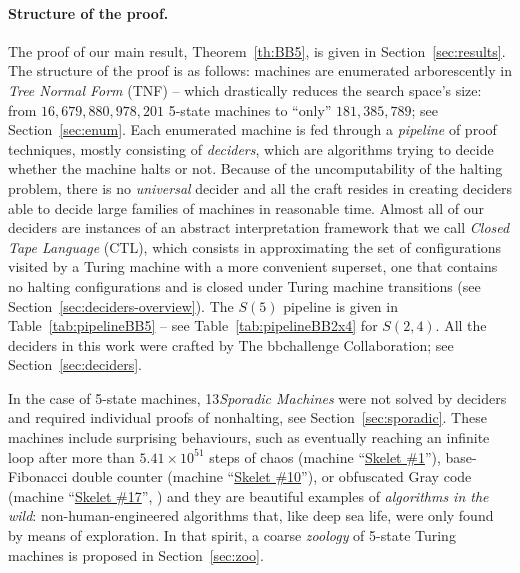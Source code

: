 \documentclass[a4paper,british]{article}
\theoremstyle{definition} %
\numberwithin{equation}{section}
\theoremstyle{definition} %
\newcommand{\BBtheFifthTNF}{181{,}385{,}789}
\newcommand{\numSporadic}{13\xspace}
\begin{document}
\paragraph{Structure of the proof.} The proof of our main result, Theorem~\ref{th:BB5}, is given in Section~\ref{sec:results}. The structure of the proof is as follows: machines are enumerated arborescently in \textit{Tree Normal Form} (TNF) \cite{Brady64} -- which drastically reduces the search space's size: from $16{,}679{,}880{,}978{,}201$ 5-state machines to ``only'' $\BBtheFifthTNF$; see Section~\ref{sec:enum}. Each enumerated machine is fed through a \textit{pipeline} of proof techniques, mostly consisting of \textit{deciders}, which are algorithms trying to decide whether the machine halts or not. Because of the uncomputability of the halting problem, there is no \textit{universal} decider and all the craft resides in creating deciders able to decide large families of machines in reasonable time. Almost all of our deciders are instances of an abstract interpretation framework that we call \textit{Closed Tape Language} (CTL), which consists in approximating the set of configurations visited by a Turing machine with a more convenient superset, one that contains no halting configurations and is closed under Turing machine transitions (see Section~\ref{sec:deciders-overview}). The $S(5)$ pipeline is given in Table~\ref{tab:pipelineBB5} -- see Table~\ref{tab:pipelineBB2x4} for $S(2,4)$. All the deciders in this work were crafted by The bbchallenge Collaboration; see Section~\ref{sec:deciders}.

In the case of 5-state machines, \numSporadic \textit{Sporadic Machines} were not solved by deciders and required individual proofs of nonhalting, see Section~\ref{sec:sporadic}. These machines include surprising behaviours, such as eventually reaching an infinite loop after more than $5.41\times10^{51}$ steps of chaos (machine ``\href{https://bbchallenge.org/1RB1RD_1LC0RC_1RA1LD_0RE0LB_---1RC}{Skelet \#1}''), base-Fibonacci double counter (machine ``\href{https://bbchallenge.org/1RB0RA_0LC1RA_1RE1LD_1LC0LD_---0RB}{Skelet \#10}''), or obfuscated Gray code (machine ``\href{https://bbchallenge.org/1RB---_0LC1RE_0LD1LC_1RA1LB_0RB0RA}{Skelet \#17}'', \cite{xu2024skelet17fifthbusy}) and they are beautiful examples of \textit{algorithms in the wild}: non-human-engineered algorithms that, like deep sea life, were only found by means of exploration. In that spirit, a coarse \textit{zoology} of 5-state Turing machines is proposed in Section~\ref{sec:zoo}.
\end{document}
